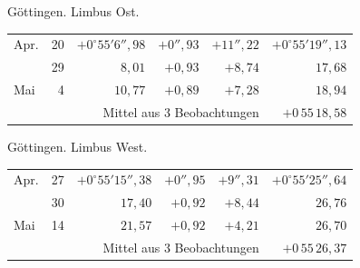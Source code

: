 \noindent\begin{minipage}[t]{.495\textwidth}\centering Göttingen. Limbus Ost.\par\smallskip
{\scriptsize\setlength{\tabcolsep}{1pt}\renewcommand{\arraystretch}{1.2}\begin{tabular}{lr|r|r|r|r|}
Apr.&20&$+0^\circ55'6''{,}98$&$+0''{,}93$&$+11''{,}22$&$+0^\circ55'19''{,}13$\\
&29&$8{,}01$&$+0{,}93$&$+8{,}74$&$17{,}68$\\
Mai&4&$10{,}77$&$+0{,}89$&$+7{,}28$&$18{,}94$\\
\cline{6-6}\multicolumn{5}{r}{Mittel aus 3 Beobachtungen}&$+0\,55\,18{,}58$
\end{tabular}}\end{minipage}\hfill\begin{minipage}[t]{.495\textwidth}\centering Göttingen. Limbus West.\par\smallskip
{\scriptsize\setlength{\tabcolsep}{1pt}\renewcommand{\arraystretch}{1.2}\begin{tabular}{lr|r|r|r|r}
Apr.&27&$+0^\circ55'15''{,}38$&$+0''{,}95$&$+9''{,}31$&$+0^\circ55'25''{,}64$\\
&30&$17{,}40$&$+0{,}92$&$+8{,}44$&$26{,}76$\\
Mai&14&$21{,}57$&$+0{,}92$&$+4{,}21$&$26{,}70$\\
\cline{6-6}\multicolumn{5}{r}{Mittel aus 3 Beobachtungen}&$+0\,55\,26{,}37$
\end{tabular}}\end{minipage}
\par\vspace{4mm}

